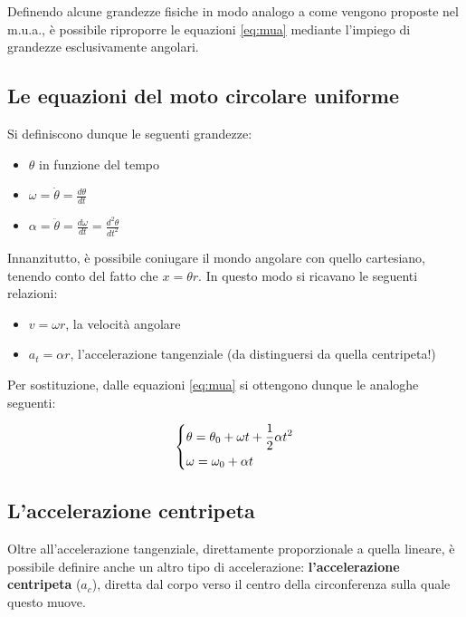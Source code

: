 \documentclass[oneside]{book}
\begin{document}
Definendo alcune grandezze fisiche in modo analogo a come vengono
proposte nel m.u.a., è possibile riproporre le equazioni \ref{eq:mua}
mediante l'impiego di grandezze esclusivamente angolari.

\subsection{Le equazioni del moto circolare uniforme}

Si definiscono dunque le seguenti grandezze:

\begin{itemize}
    \item $\theta$ in funzione del tempo
    \item $\displaystyle \omega=\dot{\theta}=\frac{d\theta}{dt}$
    \item $\displaystyle \alpha=\ddot{\theta}=\frac{d\omega}{dt}=\frac{d^2\theta}{dt^2}$
\end{itemize}

Innanzitutto, è possibile coniugare il mondo angolare con quello
cartesiano, tenendo conto del fatto che $x=\theta r$. In questo modo
si ricavano le seguenti relazioni:

\begin{itemize}
    \item $\displaystyle v=\omega r$, la velocità angolare
    \item $\displaystyle a_t=\alpha r$, l'accelerazione tangenziale
    (da distinguersi da quella centripeta!)
\end{itemize}

Per sostituzione, dalle equazioni \ref{eq:mua} si ottengono dunque
le analoghe seguenti:

\begin{equation}
    \begin{dcases}
        \theta = \theta_0 + \omega t + \frac12 \alpha t^2 \\
        \omega = \omega_0 + \alpha t
    \end{dcases}
\end{equation}

\subsection{L'accelerazione centripeta}

Oltre all'accelerazione tangenziale, direttamente proporzionale a
quella lineare, è possibile definire anche un altro tipo di
accelerazione: \textbf{l'accelerazione centripeta} ($a_c$), diretta dal
corpo verso il centro della circonferenza sulla quale questo muove.
\end{document}
